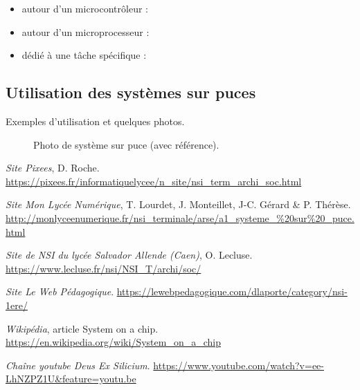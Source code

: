 \documentclass[a4paper,11pt]{article}
\begin{document}
\begin{itemize}
\item autour d'un microcontrôleur :

\item autour d'un microprocesseur :

\item dédié à une tâche spécifique :
\end{itemize}

\subsection{Utilisation des systèmes sur puces}

Exemples d'utilisation et quelques photos.

\begin{figure}[!h]
\begin{center}
  \caption{Photo de système sur puce (avec référence).}
  \label{etiquette_de_la_figure_pour_y_faire_reference_plus_tard}
\end{center}
\end{figure}

\begin{thebibliography}{00}

  {\em Site Pixees}, D. Roche.
  \url{https://pixees.fr/informatiquelycee/n_site/nsi_term_archi_soc.html}

  {\em Site Mon Lycée Numérique}, T. Lourdet, J. Monteillet, J-C. Gérard \& P. Thérèse.
  \url{http://monlyceenumerique.fr/nsi_terminale/arse/a1_systeme_\%20sur\%20_puce.html}

  {\em Site de NSI du lycée Salvador Allende (Caen)}, O. Lecluse.
  \url{https://www.lecluse.fr/nsi/NSI_T/archi/soc/}

  
  {\em Site Le Web Pédagogique}.
  \url{https://lewebpedagogique.com/dlaporte/category/nsi-1ere/}

  {\em Wikipédia}, article \og System on a chip\fg.
  \url{https://en.wikipedia.org/wiki/System_on_a_chip}

  {\em Chaîne youtube Deus Ex Silicium}.
  \url{https://www.youtube.com/watch?v=ee-LhNZPZ1U&feature=youtu.be}

\end{thebibliography}

\end{document}
